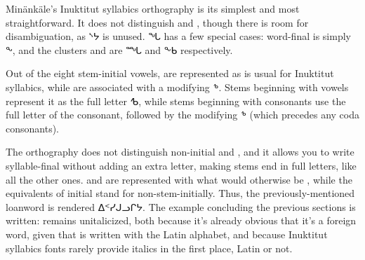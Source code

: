 \noindent Min\"ank\"ale's Inuktitut syllabics orthography is its simplest and
most straightforward. It does not distinguish  and , though
there is room for disambiguation, as {\inufont ᔅᔭ} is unused. {\inufont ᖓ} has a
few special cases: word-final  is simply {\inufont ᖕ}, and the clusters
 and  are {\inufont ᙵ} and {\inufont ᖕᑲ} respectively.

Out of the eight stem-initial
vowels, \mbox{} are represented as is usual for Inuktitut syllabics,
while \mbox{} are associated with a modifying {\inufont ᕻ}.
Stems beginning with vowels represent it as the full letter {\inufont ᕹ}, while
stems beginning with consonants use the full letter of the consonant, followed
by the modifying {\inufont ᕻ} (which precedes any coda consonants).

The orthography does not distinguish non-initial  and , and it
allows you to write syllable-final  without adding an extra letter,
making  stems end in full letters, like all the other ones. 
and  are represented with what would otherwise be \mbox{}, while
the equivalents of initial \mbox{} stand for \mbox{}
non-stem-initially. Thus, the previously-mentioned loanword 
is rendered {\inufont ᐃᑉᓯᒍᓗᒋᔭ}. The example concluding the previous sections is
written:
 remains unitalicized, both because it's already obvious that
it's a foreign word, given that is written with the Latin alphabet, and because
Inuktitut syllabics fonts rarely provide italics in the first place, Latin or
not.
